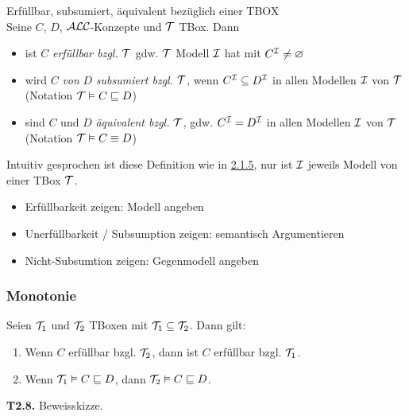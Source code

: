\begin{definition}{Erfüllbar, subsumiert, äquivalent bezüglich einer TBOX} \\
Seine $C$, $D$, $\mathcal{A}\mathcal{L}\mathcal{C}$-Konzepte und $\mathcal{T}$ TBox. Dann

\begin{itemize}
  \item ist $C$ \emph{erfüllbar bzgl.} $\mathcal{T}$ gdw. $\mathcal{T}$ Modell $\mathcal{I}$ hat mit $C^{\mathcal{I}} \neq \varnothing$
  \item wird $C$ \emph{von} $D$ \emph{subsumiert bzgl.} $\mathcal{T}$, wenn $C^{\mathcal{I}} \subseteq D^{\mathcal{I}}$ in allen Modellen $\mathcal{I}$ von $\mathcal{T}$ (Notation $\mathcal{T} \vDash C \sqsubseteq D$)
  \item sind $C$ und $D$ \emph{äquivalent bzgl.} $\mathcal{T}$, gdw. $C^{\mathcal{I}} = D^{\mathcal{I}}$ in allen Modellen $\mathcal{I}$ von $\mathcal{T}$ (Notation $\mathcal{T} \vDash C \equiv D$)
\end{itemize}
\end{definition}

Intuitiv gesprochen ist diese Definition wie in \protect\hyperlink{erfuxfcllbarkeit-subsumtion-uxe4quivalenz}{2.1.5}, nur ist $\mathcal{I}$ jeweils Modell von einer TBox $\mathcal{T}$.

\begin{itemize}
\item
  Erfüllbarkeit zeigen: Modell angeben
\item
  Unerfüllbarkeit / Subsumption zeigen: semantisch Argumentieren
\item
  Nicht-Subsumtion zeigen: Gegenmodell angeben
\end{itemize}

\subsubsection{Monotonie}\label{monotonie}

\begin{lemma}
Seien $\mathcal{T}_{1}$ und $\mathcal{T}_{2}$ TBoxen mit $\mathcal{T}_{1} \subseteq \mathcal{T}_{2}$. Dann gilt:
\end{lemma}

\begin{enumerate}
\def\labelenumi{\arabic{enumi}.}
\item
  Wenn $C$ erfüllbar bzgl. $\mathcal{T}_{2}$, dann ist $C$ erfüllbar bzgl.
  $\mathcal{T}_{1}$.
\item
  Wenn $\mathcal{T}_{1} \vDash C \sqsubseteq D$, dann
  $\mathcal{T}_{2} \vDash C \sqsubseteq D$.
\end{enumerate}

\textbf{T2.8.} Beweisskizze.

